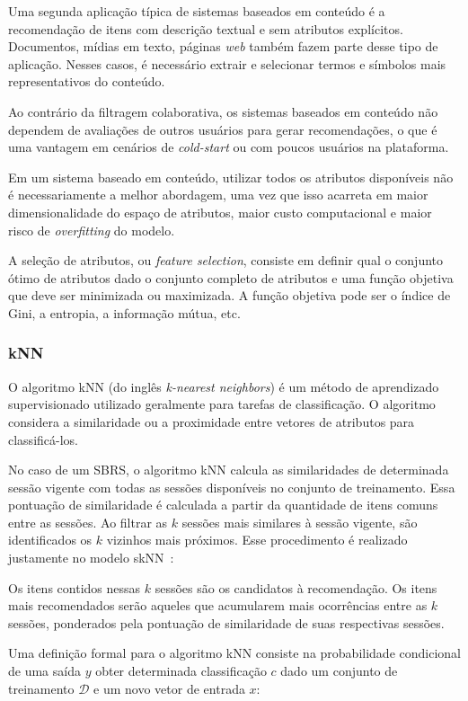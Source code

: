 Uma segunda aplicação típica de sistemas baseados em conteúdo é a recomendação
de itens com descrição textual e sem atributos explícitos. Documentos,
mídias em texto, páginas \textit{web} também fazem parte desse tipo de
aplicação. Nesses casos, é necessário extrair e selecionar termos e símbolos
mais representativos do conteúdo.


Ao contrário da filtragem colaborativa, os sistemas baseados em conteúdo não
dependem de avaliações de outros usuários para gerar recomendações, o que é uma
vantagem em cenários de \textit{cold-start} ou com poucos usuários na
plataforma.

Em um sistema baseado em conteúdo,
utilizar todos os atributos disponíveis não é necessariamente a melhor
abordagem, uma vez que isso acarreta em maior dimensionalidade do espaço de
atributos, maior custo computacional e maior risco de \textit{overfitting} do
modelo.


A seleção de atributos, ou \textit{feature selection}, consiste em definir qual
o conjunto ótimo de atributos dado o conjunto completo de
atributos e uma função objetiva que deve ser minimizada ou maximizada. A função
objetiva pode ser o índice de Gini, a entropia, a informação mútua, etc.

\subsubsection{kNN}
O algoritmo kNN (do inglês \textit{k-nearest neighbors}) é um método de
aprendizado supervisionado utilizado geralmente para tarefas de classificação. O
algoritmo considera a similaridade ou a proximidade entre vetores de atributos
para classificá-los.

No caso de um SBRS, o algoritmo kNN calcula as similaridades de determinada
sessão vigente com todas as sessões disponíveis no conjunto de treinamento. Essa
pontuação de similaridade é calculada a partir da quantidade de itens comuns
entre as sessões. Ao filtrar as $k$ sessões mais similares à sessão vigente, são
identificados os $k$ vizinhos mais próximos. Esse procedimento é realizado
justamente no modelo skNN~\cite{ludewig_2019}:

Os itens contidos nessas $k$ sessões são os candidatos à recomendação. Os
itens mais recomendados serão aqueles que acumularem mais ocorrências entre as
$k$ sessões, ponderados pela pontuação de similaridade de suas
respectivas sessões.

Uma definição formal \cite{murphy} para o algoritmo kNN consiste na probabilidade
condicional de uma saída $y$ obter determinada classificação $c$ dado um conjunto
de treinamento $\mathcal{D}$ e um novo vetor de entrada $x$:

